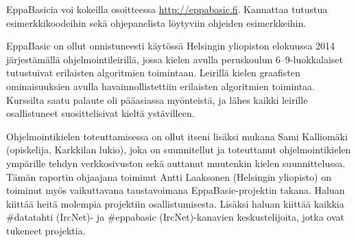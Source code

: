EppaBasicia voi kokeilla osoitteessa
\url{http://eppabasic.fi}.
Kannattaa tutustua esimerkkikoodeihin
sekä ohjepanelista löytyviin
ohjeiden esimerkkeihin.

EppaBasic on ollut onnistuneesti käytössä
Helsingin yliopiston elokuussa 2014
järjestämällä ohjelmointileirillä,
jossa kielen avulla peruskoulun
6--9-luokkalaiset
tutustuivat erilaisten algoritmien toimintaan.
Leirillä kielen graafisten ominaisuuksien
avulla havainnollistettiin erilaisten
algoritmien toimintaa.
Kurssilta saatu palaute oli pääasiassa myönteistä,
ja lähes kaikki leirille osallistuneet
suosittelisivat kieltä ystävilleen.

Ohjelmointikielen toteuttamisessa on
ollut itseni lisäksi mukana
Sami Kalliomäki (opiskelija, Karkkilan lukio),
joka on suunnitellut ja toteuttanut
ohjelmointikielen ympärille tehdyn verkkosivuston
sekä auttanut muutenkin kielen suunnittelussa.
Tämän raportin ohjaajana toiminut
Antti Laaksonen (Helsingin yliopisto)
on toiminut myös vaikuttavana
taustavoimana EppaBasic-projektin takana.
Haluan kiittää heitä molempia
projektiin osallistumisesta.
Lisäksi haluan kiittää kaikkia
\#datatahti (IrcNet)- ja
\#eppabasic (IrcNet)-kanavien keskustelijoita,
jotka ovat tukeneet projektia.